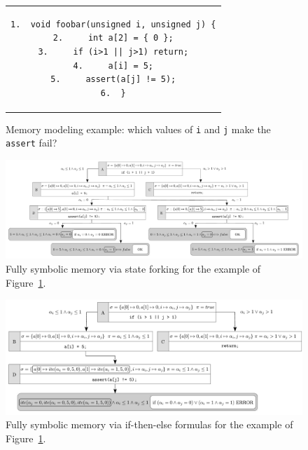 \begin{figure}[t]
\begin{center}
\begin{tabular}{c}
\begin{lstlisting}[basicstyle=\ttfamily\small]
1.  void foobar(unsigned i, unsigned j) {
2.     int a[2] = { 0 };
3.     if (i>1 || j>1) return;
4.     a[i] = 5;
5.     assert(a[j] != 5);
6.  }
\end{lstlisting}
\end{tabular}
\end{center}
\caption{Memory modeling example: which values of \texttt{i} and \texttt{j} make the \texttt{assert} fail?}
\label{fi:example-mem}
\end{figure}

\begin{figure}[t]
\includegraphics[width=1\columnwidth]{images/memory-fork} 
\caption{Fully symbolic memory via state forking for the example of Figure~\ref{fi:example-mem}.}
\label{fi:memory-fork}
\end{figure}

\begin{figure}[t]
\includegraphics[width=1\columnwidth]{images/memory-ite} 
\caption{Fully symbolic memory via if-then-else formulas for the example of Figure~\ref{fi:example-mem}.}
\label{fi:memory-ite}
\end{figure}

